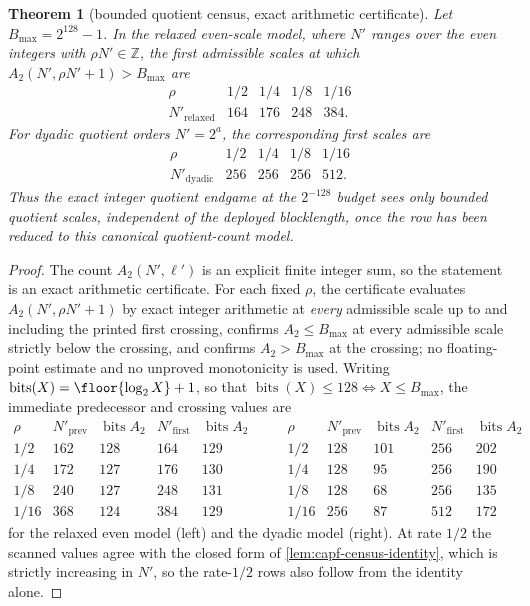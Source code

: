 \documentclass[11pt]{article}
\newtheorem{theorem}{Theorem}[section]
\theoremstyle{definition}
\theoremstyle{remark}
\begin{document}
\begin{theorem}[bounded quotient census, exact arithmetic certificate]\label{thm:capf-census}
Let $B_{\max}=2^{128}-1$.  In the relaxed even-scale model, where $N'$ ranges over the even integers with $\rho N'\in\mathbb Z$, the first admissible scales at which $A_2(N',\rho N'+1)>B_{\max}$ are
\[
\begin{array}{c|cccc}
\rho & 1/2 & 1/4 & 1/8 & 1/16\\ \hline
N'_{\mathrm{relaxed}} & 164 & 176 & 248 & 384 .
\end{array}
\]
For dyadic quotient orders $N'=2^a$, the corresponding first scales are
\[
\begin{array}{c|cccc}
\rho & 1/2 & 1/4 & 1/8 & 1/16\\ \hline
N'_{\mathrm{dyadic}} & 256 & 256 & 256 & 512 .
\end{array}
\]
Thus the exact integer quotient endgame at the $2^{-128}$ budget sees only bounded quotient scales, independent of the deployed blocklength, once the row has been reduced to this canonical quotient-count model.
\end{theorem}

\begin{proof}
The count $A_2(N',\ell')$ is an explicit finite integer sum, so the statement is an exact arithmetic certificate.  For each fixed $\rho$, the certificate evaluates $A_2(N',\rho N'+1)$ by exact integer arithmetic at \emph{every} admissible scale up to and including the printed first crossing, confirms $A_2\le B_{\max}$ at every admissible scale strictly below the crossing, and confirms $A_2>B_{\max}$ at the crossing; no floating-point estimate and no unproved monotonicity is used.  Writing $\operatorname{bits}(X)=\floor{\log_2X}+1$, so that $\operatorname{bits}(X)\le128\iff X\le B_{\max}$, the immediate predecessor and crossing values are
\[
\begin{array}{c|cc|cc}
\rho & N'_{\mathrm{prev}} & \operatorname{bits} A_2 & N'_{\mathrm{first}} & \operatorname{bits} A_2\\ \hline
1/2  & 162 & 128 & 164 & 129\\
1/4  & 172 & 127 & 176 & 130\\
1/8  & 240 & 127 & 248 & 131\\
1/16 & 368 & 124 & 384 & 129
\end{array}
\qquad
\begin{array}{c|cc|cc}
\rho & N'_{\mathrm{prev}} & \operatorname{bits} A_2 & N'_{\mathrm{first}} & \operatorname{bits} A_2\\ \hline
1/2  & 128 & 101 & 256 & 202\\
1/4  & 128 &  95 & 256 & 190\\
1/8  & 128 &  68 & 256 & 135\\
1/16 & 256 &  87 & 512 & 172
\end{array}
\]
for the relaxed even model \textup{(left)} and the dyadic model \textup{(right)}.  At rate $1/2$ the scanned values agree with the closed form of \cref{lem:capf-census-identity}, which is strictly increasing in $N'$, so the rate-$1/2$ rows also follow from the identity alone.
\end{proof}
\end{document}
